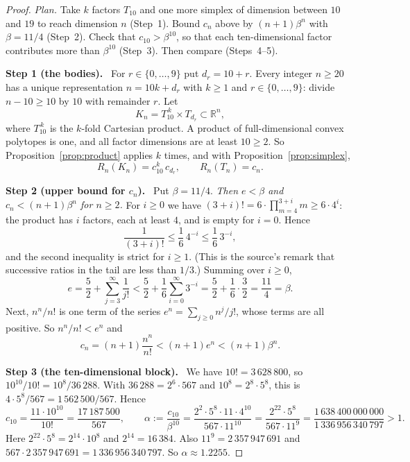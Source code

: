 \documentclass[11pt]{article}
\newcommand{\R}{\mathbb R}
\newcommand{\step}[1]{\par\smallskip\noindent\textbf{#1}\ }
\begin{document}
\begin{proof}
\emph{Plan.} Take \(k\) factors \(T_{10}\) and one more simplex of
dimension between \(10\) and \(19\) to reach dimension \(n\) (Step~1).
Bound \(c_n\) above by \((n+1)\beta^n\) with \(\beta=11/4\) (Step~2). Check
that \(c_{10}>\beta^{10}\), so that each ten-dimensional factor
contributes more than \(\beta^{10}\) (Step~3). Then compare (Steps~4--5).

\step{Step 1 (the bodies).} For \(r\in\{0,\ldots,9\}\) put \(d_r=10+r\).
Every integer \(n\ge20\) has a unique representation \(n=10k+d_r\) with
\(k\ge1\) and \(r\in\{0,\dots,9\}\): divide \(n-10\ge10\) by \(10\) with
remainder \(r\). Let
\[
 K_n=T_{10}^{\,k}\times T_{d_r}\subset\R^n,
\]
where \(T_{10}^{\,k}\) is the \(k\)-fold Cartesian product. A product of
full-dimensional convex polytopes is one, and all factor dimensions are at
least \(10\ge2\). So Proposition~\ref{prop:product} applies \(k\) times,
and with Proposition~\ref{prop:simplex},
\[
 R_n(K_n)=c_{10}^k\,c_{d_r},\qquad R_n(T_n)=c_n.
\]

\step{Step 2 (upper bound for \(c_n\)).} Put \(\beta=11/4\). \emph{Then
\(e<\beta\) and \(c_n<(n+1)\beta^n\) for \(n\ge2\).} For \(i\ge0\) we have
\((3+i)!=6\cdot\prod_{m=4}^{3+i}m\ge6\cdot4^i\): the product has \(i\)
factors, each at least \(4\), and is empty for \(i=0\). Hence
\[
 \frac1{(3+i)!}\le\frac16\,4^{-i}\le\frac16\,3^{-i},
\]
and the second inequality is strict for \(i\ge1\). (This is the source's
remark that successive ratios in the tail are less than \(1/3\).) Summing
over \(i\ge0\),
\[
 e=\frac52+\sum_{j=3}^{\infty}\frac1{j!}
 <\frac52+\frac16\sum_{i=0}^{\infty}3^{-i}
 =\frac52+\frac16\cdot\frac32=\frac{11}4=\beta.
\]
Next, \(n^n/n!\) is one term of the series
\(e^n=\sum_{j\ge0}n^j/j!\), whose terms are all positive. So
\(n^n/n!<e^n\) and
\[
 c_n=(n+1)\frac{n^n}{n!}<(n+1)e^n<(n+1)\beta^n.
\]

\step{Step 3 (the ten-dimensional block).} We have \(10!=3\,628\,800\), so
\(10^{10}/10!=10^8/36\,288\). With \(36\,288=2^6\cdot567\) and
\(10^8=2^8\cdot5^8\), this is \(4\cdot5^8/567=1\,562\,500/567\). Hence
\[
 c_{10}=\frac{11\cdot10^{10}}{10!}=\frac{17\,187\,500}{567},
 \qquad
 \alpha:=\frac{c_{10}}{\beta^{10}}
 =\frac{2^2\cdot5^8\cdot11\cdot4^{10}}{567\cdot11^{10}}
 =\frac{2^{22}\cdot5^8}{567\cdot11^9}
 =\frac{1\,638\,400\,000\,000}{1\,336\,956\,340\,797}>1.
\]
Here \(2^{22}\cdot5^8=2^{14}\cdot10^8\) and \(2^{14}=16\,384\). Also
\(11^9=2\,357\,947\,691\) and
\(567\cdot2\,357\,947\,691=1\,336\,956\,340\,797\). So
\(\alpha\approx1.2255\).


\end{proof}
\end{document}
